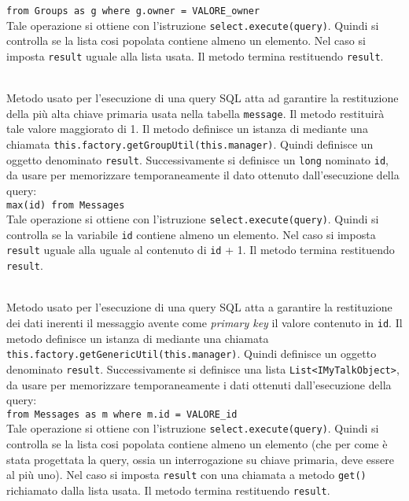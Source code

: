 \begin{description}
	\verb|from Groups as g where g.owner = VALORE_owner|\\
	
	Tale operazione si ottiene con l'istruzione \verb|select.execute(query)|. Quindi si controlla se la lista cosi popolata contiene almeno un elemento. Nel caso si imposta \texttt{result} uguale alla lista usata. Il metodo termina restituendo \texttt{result}.
	
	\item{}\\
	Metodo usato per l'esecuzione di una query SQL atta ad garantire la restituzione della più alta chiave primaria usata nella tabella \texttt{message}. Il metodo restituirà tale valore maggiorato di 1. Il metodo definisce un istanza di  mediante una chiamata \verb|this.factory.getGroupUtil(this.manager)|. Quindi definisce un oggetto  denominato \texttt{result}. Successivamente si definisce un \texttt{long} nominato \texttt{id}, da usare per memorizzare temporaneamente il dato ottenuto dall'esecuzione della query:\\
	
	\verb|max(id) from Messages|\\
	
	Tale operazione si ottiene con l'istruzione \verb|select.execute(query)|. Quindi si controlla se la variabile \texttt{id} contiene almeno un elemento. Nel caso si imposta \texttt{result} uguale alla uguale al contenuto di \texttt{id} + 1. Il metodo termina restituendo \texttt{result}.
	
	\item{}\\
	Metodo usato per l'esecuzione di una query SQL atta a garantire la restituzione dei dati inerenti il messaggio avente come \textit{primary key} il valore contenuto in \texttt{id}. Il metodo definisce un istanza di  mediante una chiamata \verb|this.factory.getGenericUtil(this.manager)|. Quindi definisce un oggetto  denominato \texttt{result}. Successivamente si definisce una lista \texttt{List<IMyTalkObject>}, da usare per memorizzare temporaneamente i dati ottenuti dall'esecuzione della query:\\
	
	\verb|from Messages as m where m.id = VALORE_id|\\
	
	Tale operazione si ottiene con l'istruzione \verb|select.execute(query)|. Quindi si controlla se la lista cosi popolata contiene almeno un elemento (che per come è stata progettata la query, ossia un interrogazione su chiave primaria, deve essere al più uno). Nel caso si imposta \texttt{result} con una chiamata a metodo \texttt{get()} richiamato dalla lista usata. Il metodo termina restituendo \texttt{result}.
	

\end{description}

